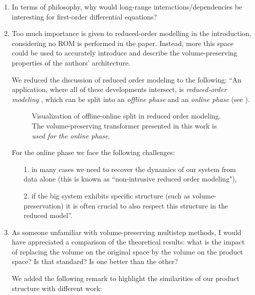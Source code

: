 \documentclass{article}
\begin{document}
\begin{enumerate}
    \item In terms of philosophy, why would long-range interactions/dependencies be interesting for first-order differential equations?
    \item Too much importance is given to reduced-order modelling in the introduction, considering no ROM is performed in the paper. Instead, more this space could be used to accurately introduce and describe the volume-preserving properties of the authors' architecture.
        
    
    {\color{mred} We reduced the discussion of reduced order modeling to the following: ``An application, where all of these developments intersect, is \textit{reduced-order modeling} , which can be split into an \textit{offline phase} and an \textit{online phase} (see ).

        \begin{figure}[h]
        \centering
        
        \caption{\color{mred}Visualization of offline-online split in reduced order modeling. The volume-preserving transformer presented in this work is \textit{used for the online phase}.}
        \label{fig:OfflineOnlineSplit}
        \end{figure}
        
        For the online phase we face the following challenges:
        
        \begin{itemize}
        \item[1. ] in many cases we need to recover the dynamics of our system from data alone (this is known as ``non-intrusive reduced order modeling"), 
        \item[2. ] if the big system exhibits specific structure (such as volume-preservation) it is often crucial to also respect this structure in the reduced model''.  
        \end{itemize}}

    \item As someone unfamiliar with volume-preserving multistep methods, I would have appreciated a comparison of the theoretical results: what is the impact of replacing the volume on the original space by the volume on the product space? Is that standard? Is one better than the other?
        {\color{mred} We added the following remark to highlight the similarities of our product structure with different work:
        
}
\end{enumerate}
\end{document}
